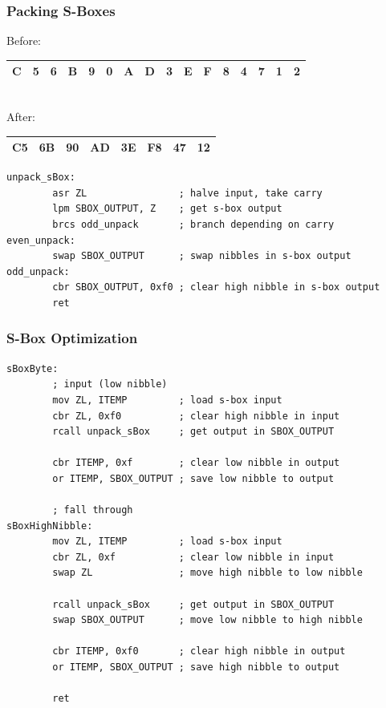 \documentclass{beamer}
\begin{document}
\begin{frame}[fragile]
\frametitle{Packing S-Boxes}
	\footnotesize{
	Before: \\
	\begin{tabular}{ | c | c | c | c | c | c | c | c | c | c | c | c | c | c | c | c | }
	  \hline                        
	  C & 5 & 6 & B & 9 & 0 & A & D & 3 & E & F & 8 & 4 & 7 & 1 & 2 \\
	  \hline  
	\end{tabular}
	\\

	After: \\
	\begin{tabular}{ | c | c | c | c | c | c | c | c | }
	  \hline                        
	  C5 & 6B & 90 & AD & 3E & F8 & 47 & 12 \\
	  \hline  
	\end{tabular}
	}

\begin{lstlisting}
unpack_sBox:
        asr ZL                ; halve input, take carry
        lpm SBOX_OUTPUT, Z    ; get s-box output
        brcs odd_unpack       ; branch depending on carry
even_unpack:
        swap SBOX_OUTPUT      ; swap nibbles in s-box output
odd_unpack:
        cbr SBOX_OUTPUT, 0xf0 ; clear high nibble in s-box output
        ret
\end{lstlisting}
\end{frame}

\begin{frame}[fragile]
\frametitle{S-Box Optimization}
\begin{lstlisting}
sBoxByte:
        ; input (low nibble)
        mov ZL, ITEMP         ; load s-box input
        cbr ZL, 0xf0          ; clear high nibble in input
        rcall unpack_sBox     ; get output in SBOX_OUTPUT

        cbr ITEMP, 0xf        ; clear low nibble in output
        or ITEMP, SBOX_OUTPUT ; save low nibble to output

        ; fall through
sBoxHighNibble:
        mov ZL, ITEMP         ; load s-box input
        cbr ZL, 0xf           ; clear low nibble in input
        swap ZL               ; move high nibble to low nibble

        rcall unpack_sBox     ; get output in SBOX_OUTPUT
        swap SBOX_OUTPUT      ; move low nibble to high nibble

        cbr ITEMP, 0xf0       ; clear high nibble in output
        or ITEMP, SBOX_OUTPUT ; save high nibble to output

        ret
\end{lstlisting}
\end{frame}
\end{document}
